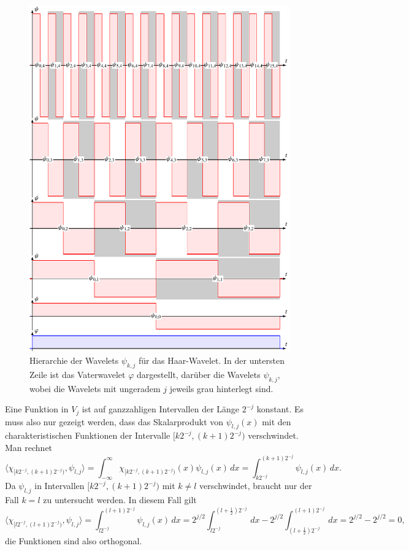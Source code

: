 \begin{figure}
\centering
\includegraphics{chapters/3-haar/images/wavelets.pdf}
\caption{Hierarchie der Wavelets $\psi_{k,j}$ für das Haar-Wavelet.
In der untersten Zeile ist das Vaterwavelet $\varphi$ dargestellt,
darüber die Wavelets $\psi_{k,j}$, wobei die Wavelets mit ungeradem
$j$ jeweils grau hinterlegt sind.
\label{haar:allwavelets:image}}
\end{figure}

Eine Funktion in $V_j$ ist auf ganzzahligen Intervallen der Länge
$2^{-j}$ konstant.
Es muss also nur gezeigt werden, dass das Skalarprodukt von $\psi_{l,j}(x)$
mit den charakteristischen Funktionen der Intervalle $[k2^{-j},(k+1)2^{-j})$
verschwindet.
Man rechnet
\[
\langle \chi_{[k2^{-j},(k+1)2^{-j})},\psi_{l,j}\rangle
=
\int_{-\infty}^\infty \chi_{[k2^{-j},(k+1)2^{-j})}(x) \psi_{l,j}(x)\,dx
=
\int_{k2^{-j}}^{(k+1)2^{-j}} \psi_{l,j}(x)\,dx.
\]
Da $\psi_{l,j}$ in Intervallen $[k2^{-j},(k+1)2^{-j})$ mit
$k\ne l$ verschwindet, braucht nur der Fall $k=l$ zu untersucht werden.
In diesem Fall gilt
\[
\langle \chi_{[l2^{-j},(l+1)2^{-j})},\psi_{l,j}\rangle
=
\int_{l2^{-j}}^{(l+1)2^{-j}} \psi_{l,j}(x)\,dx
=
2^{j/2}
\int_{l2^{-j}}^{(l+\frac12)2^{-j}} \,dx
-
2^{j/2}
\int_{(l+\frac12)2^{-j}}^{(l+1)2^{-j}} \,dx
=
2^{j/2}
-
2^{j/2}
=
0,
\]
die Funktionen sind also orthogonal.

